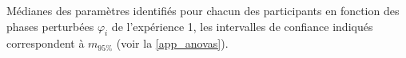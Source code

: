 \begin{appendices}
	Médianes des paramètres identifiés pour chacun des participants en fonction des phases perturbées $\varphi_i$ de l'expérience 1, les intervalles de confiance indiqués correspondent à $m_{95\%}$ (voir la \cref{app_anovas}).
	
	\vspace{2mm}
	

\end{appendices}

